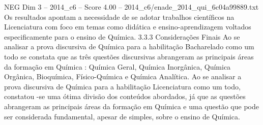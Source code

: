 \begin{textsample}{NEG Dim 3 – 2014\_c6 – Score 4.00 – 2014\_c6/enade\_2014\_qui\_6c04a99889.txt}
Os resultados apontam a necessidade de se adotar trabalhos científicos na Licenciatura com foco em temas como didática e ensino-aprendizagem voltados especificamente para o ensino de Química. 3.3.3 Considerações Finais Ao se analisar a prova discursiva de Química para a habilitação Bacharelado como um todo se constata que as três questões discursivas abrangeram as principais áreas da formação em Química : Química Geral, Química Inorgânica, Química Orgânica, Bioquímica, Físico-Química e Química Analítica.
Ao se analisar a prova discursiva de Química para a habilitação Licenciatura como um todo, constatou -se uma ótima divisão dos conteúdos abordados, já que as questões abrangeram as principais áreas da formação em Química e uma questão que pode ser considerada fundamental, apesar de simples, sobre o ensino de Química.

\end{textsample}
